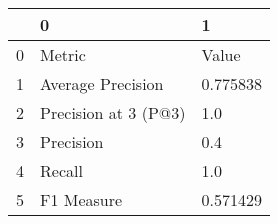 \begin{tabular}{lll}
\toprule
{} &                     0 &         1 \\
\midrule
0 &                Metric &     Value \\
1 &     Average Precision &  0.775838 \\
2 &  Precision at 3 (P@3) &       1.0 \\
3 &             Precision &       0.4 \\
4 &                Recall &       1.0 \\
5 &            F1 Measure &  0.571429 \\
\bottomrule
\end{tabular}
